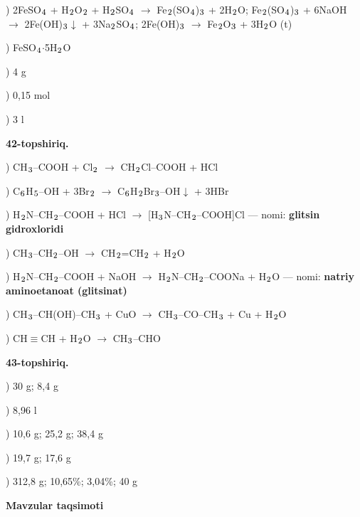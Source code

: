 \documentclass[11pt,a4paper]{article}
\renewcommand{\textsubscript}[1]{\ensuremath{_{\text{\fontsize{8}{8}\selectfont #1}}}}
\begin{document}
) 2FeSO\textsubscript{4} + H\textsubscript{2}O\textsubscript{2} + H\textsubscript{2}SO\textsubscript{4} $\to$ Fe\textsubscript{2}(SO\textsubscript{4})\textsubscript{3} + 2H\textsubscript{2}O; Fe\textsubscript{2}(SO\textsubscript{4})\textsubscript{3} + 6NaOH $\to$ 2Fe(OH)\textsubscript{3}$\downarrow$ + 3Na\textsubscript{2}SO\textsubscript{4}; 2Fe(OH)\textsubscript{3} $\to$ Fe\textsubscript{2}O\textsubscript{3} + 3H\textsubscript{2}O (t)\par
{}) FeSO\textsubscript{4}$\cdot$5H\textsubscript{2}O\par
{}) 4 g\par
{}) 0,15 mol\par
{}) 3 l\par
\noindent\textbf{42-topshiriq.}\par
{}) CH\textsubscript{3}--COOH + Cl\textsubscript{2} $\to$ CH\textsubscript{2}Cl--COOH + HCl\par
{}) C\textsubscript{6}H\textsubscript{5}--OH + 3Br\textsubscript{2} $\to$ C\textsubscript{6}H\textsubscript{2}Br\textsubscript{3}--OH$\downarrow$ + 3HBr\par
{}) H\textsubscript{2}N--CH\textsubscript{2}--COOH + HCl $\to$ [H\textsubscript{3}N--CH\textsubscript{2}--COOH]Cl --- nomi: \textbf{glitsin gidroxloridi}\par
{}) CH\textsubscript{3}--CH\textsubscript{2}--OH $\to$ CH\textsubscript{2}=CH\textsubscript{2} + H\textsubscript{2}O\par
{}) H\textsubscript{2}N--CH\textsubscript{2}--COOH + NaOH $\to$ H\textsubscript{2}N--CH\textsubscript{2}--COONa + H\textsubscript{2}O --- nomi: \textbf{natriy aminoetanoat (glitsinat)}\par
{}) CH\textsubscript{3}--CH(OH)--CH\textsubscript{3} + CuO $\to$ CH\textsubscript{3}--CO--CH\textsubscript{3} + Cu + H\textsubscript{2}O\par
{}) CH$\equiv$CH + H\textsubscript{2}O $\to$ CH\textsubscript{3}--CHO\par
\noindent\textbf{43-topshiriq.}\par
{}) 30 g; 8,4 g\par
{}) 8,96 l\par
{}) 10,6 g; 25,2 g; 38,4 g\par
{}) 19,7 g; 17,6 g\par
{}) 312,8 g; 10,65\%; 3,04\%; 40 g\par
\par\bigskip\noindent\textbf{Mavzular taqsimoti}\par\smallskip
\end{document}
